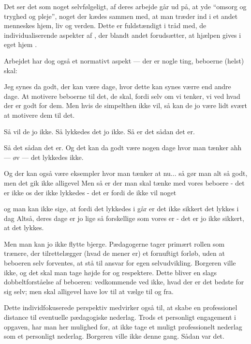 Det ser det som noget selvfølgeligt, af deres arbejde går ud på, at yde
“omsorg og tryghed og pleje”, noget der kædes sammen med, at man træder ind i et andet menneskes hjem, liv og verden.
Dette er fuldstændigt i tråd med, de individualiserende aspekter af , der blandt andet forudsætter, at hjælpen gives i eget hjem \autocite[§ 81, stk. 5]{social-ogindenrigsministerietBekendtgorelseAfLov2019}.

Arbejdet har dog også et normativt aspekt — der er nogle ting, beboerne (helst) skal:

\begin{description}
\AMB
Jeg synes da godt, der kan være dage, hvor dette kan synes værre end andre dage.
At motivere beboerne til det, de skal, fordi selv om vi tenker, vi ved hvad der er godt for dem.
Men hvis de simpelthen ikke vil, så kan de jo være lidt svært at motivere dem til det.

\DMC
Så vil de jo ikke.
Så lykkedes det jo ikke.
Så er det sådan det er.

\AMB
Så det sådan det er.
Og det kan da godt være nogen dage hvor man tænker ahh — øv — det lykkedes ikke.

\DMC
Og der kan også være eksempler hvor man tænker at nu... så gør man alt så godt, men det gik ikke alligevel
Men så er der man skal tænke med vores beboere - det er ikke os der ikke lykkedes - det er fordi de ikke vil noget 

\AMB
og man kan ikke sige, at fordi det lykkedes i går er det ikke sikkert det lykkes i dag
Altså, deres dage er jo lige så forskellige som vores er - det er jo ikke sikkert, at det lykkes.
\end{description}

Men man kan jo ikke flytte bjerge.
Pædagogerne tager primært rollen som trænere, der tilrettelægger (hvad de mener er) et fornuftigt forløb, uden at beboeren selv forventes, at stå til ansvar for egen selvudvikling.
Borgeren ville ikke, og det skal man tage højde for og respektere.
Dette bliver en slags dobbeltforståelse af beboeren: vedkommende ved ikke, hvad der er det bedste for sig selv; men skal alligevel have lov til at vælge til og fra.

Dette individfokuserede perspektiv medvirker også til, at skabe en professionel distance til eventuelle pædagogiske nederlag.
Trods et personligt engagement i opgaven, har man her mulighed for, at ikke tage et muligt professionelt nederlag som et personligt nederlag.
Borgeren ville ikke denne gang.
Sådan var det.

